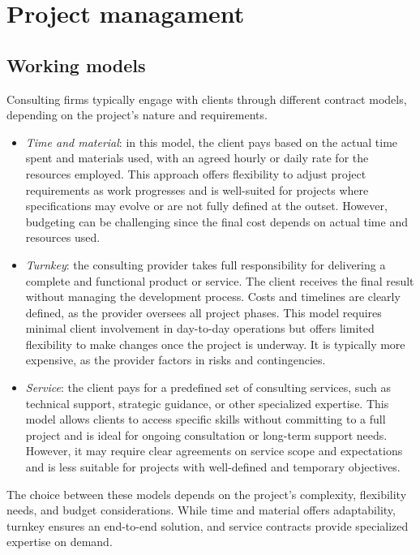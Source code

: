 \section{Project managament}



\subsection{Working models}
Consulting firms typically engage with clients through different contract models, depending on the project's nature and requirements.
\begin{itemize}
    \item \textit{Time and material}: in this model, the client pays based on the actual time spent and materials used, with an agreed hourly or daily rate for the resources employed. 
        This approach offers flexibility to adjust project requirements as work progresses and is well-suited for projects where specifications may evolve or are not fully defined at the outset. 
        However, budgeting can be challenging since the final cost depends on actual time and resources used.
    \item \textit{Turnkey}: the consulting provider takes full responsibility for delivering a complete and functional product or service. 
        The client receives the final result without managing the development process. 
        Costs and timelines are clearly defined, as the provider oversees all project phases. 
        This model requires minimal client involvement in day-to-day operations but offers limited flexibility to make changes once the project is underway.
        It is typically more expensive, as the provider factors in risks and contingencies.
    \item \textit{Service}: the client pays for a predefined set of consulting services, such as technical support, strategic guidance, or other specialized expertise. 
        This model allows clients to access specific skills without committing to a full project and is ideal for ongoing consultation or long-term support needs. 
        However, it may require clear agreements on service scope and expectations and is less suitable for projects with well-defined and temporary objectives.
\end{itemize}
\noindent The choice between these models depends on the project's complexity, flexibility needs, and budget considerations.
While time and material offers adaptability, turnkey ensures an end-to-end solution, and service contracts provide specialized expertise on demand.


